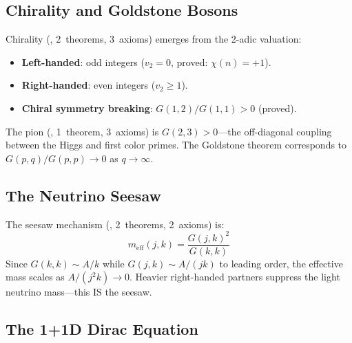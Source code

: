 \subsection{Chirality and Goldstone Bosons}
\label{sec:chirality}

Chirality (, 2~theorems, 3~axioms) emerges
from the 2-adic valuation:
\begin{itemize}
  \item \textbf{Left-handed}: odd integers ($v_2 = 0$, proved: $\chi(n) = +1$).
  \item \textbf{Right-handed}: even integers ($v_2 \geq 1$).
  \item \textbf{Chiral symmetry breaking}: $G(1,2)/G(1,1) > 0$ (proved).
\end{itemize}

The pion (, 1~theorem, 3~axioms) is
$G(2,3) > 0$---the off-diagonal coupling between the Higgs and
first color primes. The Goldstone theorem corresponds to
$G(p,q)/G(p,p) \to 0$ as $q \to \infty$.

\subsection{The Neutrino Seesaw}
\label{sec:neutrino}

The seesaw mechanism (, 2~theorems,
2~axioms) is:
\[
  m_{\text{eff}}(j,k) = \frac{G(j,k)^2}{G(k,k)}
\]
Since $G(k,k) \sim A/k$ while $G(j,k) \sim A/(jk)$ to leading order,
the effective mass scales as $A/(j^2 k) \to 0$. Heavier right-handed
partners suppress the light neutrino mass---this IS the seesaw.

\subsection{The 1+1D Dirac Equation}

